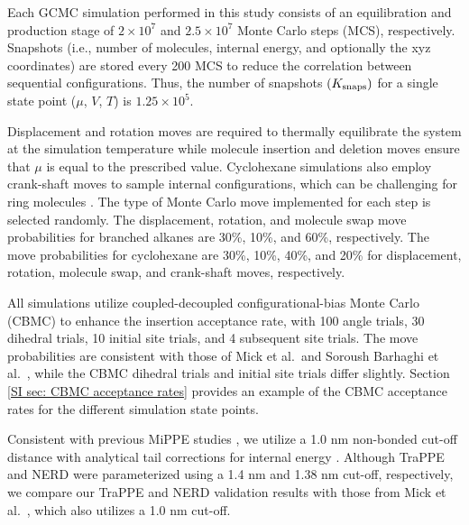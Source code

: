 \documentclass[journal=jced,manuscript=article]{achemso}
\begin{document}

Each GCMC simulation performed in this study consists of an equilibration and production stage of $2 \times 10^7$ and $2.5 \times 10^7$ Monte Carlo steps (MCS), respectively. Snapshots (i.e., number of molecules, internal energy, and optionally the xyz coordinates) are stored every 200 MCS to reduce the correlation between sequential configurations. Thus, the number of snapshots $(K_{\rm snaps})$ for a single state point ($\mu$, $V$, $T$) is $1.25 \times 10^5$.




Displacement and rotation moves are required to thermally equilibrate the system at the simulation temperature while molecule insertion and deletion moves ensure that $\mu$ is equal to the prescribed value. Cyclohexane simulations also employ crank-shaft moves to sample internal configurations, which can be challenging for ring molecules \cite{Shah2011,Binder1979}. The type of Monte Carlo move implemented for each step is selected randomly. The displacement, rotation, and molecule swap move probabilities for branched alkanes are 30\%, 10\%, and 60\%, respectively. The move probabilities for cyclohexane are 30\%, 10\%, 40\%, and 20\% for displacement, rotation, molecule swap, and crank-shaft moves, respectively. 

All simulations utilize coupled-decoupled configurational-bias Monte Carlo (CBMC)\cite{Martin1999} to enhance the insertion acceptance rate, with 100 angle trials, 30 dihedral trials, 10 initial site trials, and 4 subsequent site trials. The move probabilities are consistent with those of Mick et al.~and Soroush Barhaghi et al.~\cite{Potoff_branched,Barhaghi2017}, while the CBMC dihedral trials and initial site trials differ slightly. Section \ref{SI sec: CBMC acceptance rates} provides an example of the CBMC acceptance rates for the different simulation state points.

Consistent with previous MiPPE studies \cite{Mie,Potoff_branched,Barhaghi2017}, we utilize a 1.0 nm non-bonded cut-off distance with analytical tail corrections for internal energy \cite{Allen1987}. Although TraPPE \cite{TraPPE,Martin1999,Keasler2012} and NERD \cite{NERD,Nath2001} were parameterized using a 1.4 nm and 1.38 nm cut-off, respectively, we compare our TraPPE and NERD validation results with those from Mick et al.~\cite{Potoff_branched}, which also utilizes a 1.0 nm cut-off.
\end{document}
